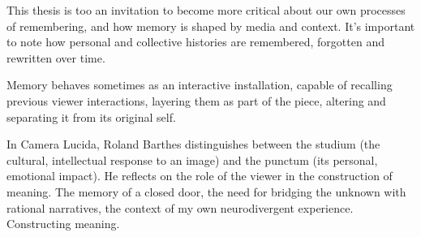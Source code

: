 This thesis is too an invitation to become more critical about our own processes of remembering, and how memory is shaped by media and context. It's important to note how personal and collective histories are remembered, forgotten and rewritten over time.

Memory behaves sometimes as an interactive installation, capable of recalling previous viewer interactions, layering them as part of the piece, altering and separating it from its original self. 

In Camera Lucida, Roland Barthes distinguishes between the studium (the cultural, intellectual response to an image) and the punctum (its personal, emotional impact). He reflects on the role of the viewer in the construction of meaning. The memory of a closed door, the need for bridging the unknown with rational narratives, the context of my own neurodivergent experience. Constructing meaning.  \citep{barthes1993}




